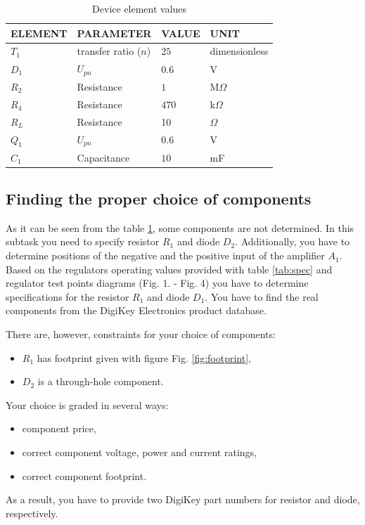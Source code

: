 \documentclass[a4paper]{article}
\begin{document}
\begin{table}[h!]
    \caption{Device element values}
    \label{tab:elems}
    \begin{tabularx}{\linewidth}{|X|X|X|X|} \hline
    ELEMENT & PARAMETER & VALUE & UNIT \\ \hline
    $T_1$ & transfer ratio ($n$) & $25$ &  dimensionless \\ \hline
    $D_1$ & $U_{pn}$ & $0.6$ & V \\ \hline 
    $R_2$ & Resistance & $1$ & M$\Omega$ \\ \hline
    $R_4$ & Resistance & $470$ & k$\Omega$ \\ \hline
    $R_L$ & Resistance & 10 & $\Omega$ \\ \hline
    $Q_1$ & $U_{pn}$ & $0.6$ & V \\ \hline
    $C_1$ & Capacitance & $10$ & mF \\ \hline
    \end{tabularx}
\end{table}

\newpage

\subsection{Finding the proper choice of components}
\label{ele:task:1}
As it can be seen from the table \ref{tab:elems}, some components are not 
determined. In this subtask you need to specify resistor $R_1$ and diode $D_2$. 
Additionally, you have to determine positions of the negative and the positive 
input of the amplifier $A_1$. Based on the regulators operating values 
provided with table \ref{tab:spec} and regulator test points diagrams 
(Fig. 1. - Fig. 4) you have to determine specifications for the resistor 
$R_1$ and diode $D_1$. You have to find the real components from the DigiKey 
Electronics product database. 

There are, however, constraints for your choice of components:
\begin{itemize}
\item $R_1$ has footprint given with figure Fig. \ref{fig:footprint},
\item $D_2$ is a through-hole component.
\end{itemize} 
 
Your choice is graded in several ways:
\begin{itemize}
\item component price,
\item correct component voltage, power and current ratings,
\item correct component footprint.
\end{itemize}
As a result, you have to provide two DigiKey part numbers for resistor and 
diode, respectively.
\end{document}
